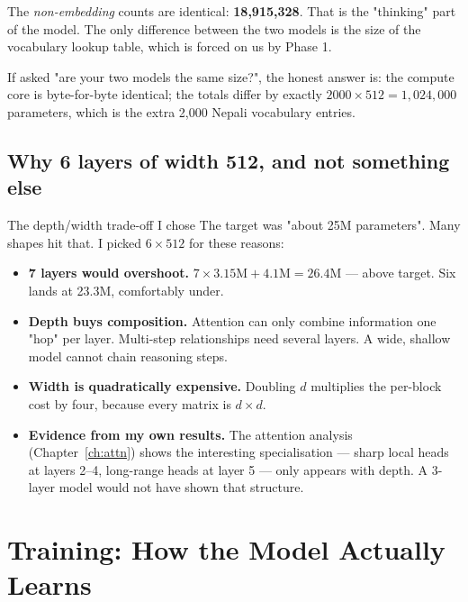 \documentclass[11pt]{report}
\begin{document}
\begin{notebox}
The \emph{non-embedding} counts are identical: \textbf{18,915,328}. That is the
"thinking" part of the model. The only difference between the two models is the
size of the vocabulary lookup table, which is forced on us by Phase 1.

If asked "are your two models the same size?", the honest answer is: the compute
core is byte-for-byte identical; the totals differ by exactly
$2000 \times 512 = 1{,}024{,}000$ parameters, which is the extra 2,000 Nepali
vocabulary entries.
\end{notebox}

\section{Why 6 layers of width 512, and not something else}

\begin{implementation}{The depth/width trade-off I chose}
The target was "about 25M parameters". Many shapes hit that. I picked
$6 \times 512$ for these reasons:

\begin{itemize}[leftmargin=*]
\item \textbf{7 layers would overshoot.} $7 \times 3.15\text{M} + 4.1\text{M}
      = 26.4$M --- above target. Six lands at 23.3M, comfortably under.
\item \textbf{Depth buys composition.} Attention can only combine information
      one "hop" per layer. Multi-step relationships need several layers. A wide,
      shallow model cannot chain reasoning steps.
\item \textbf{Width is quadratically expensive.} Doubling $d$ multiplies the
      per-block cost by four, because every matrix is $d \times d$.
\item \textbf{Evidence from my own results.} The attention analysis
      (Chapter~\ref{ch:attn}) shows the interesting specialisation --- sharp local
      heads at layers 2--4, long-range heads at layer 5 --- only appears with
      depth. A 3-layer model would not have shown that structure.
\end{itemize}
\end{implementation}


\chapter{Training: How the Model Actually Learns}
\end{document}
